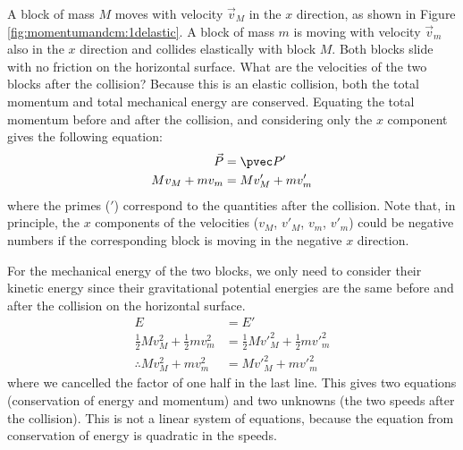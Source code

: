 \begin{example}{\label{ex:momentumandcm:1delastic}
A block of mass $M$ moves with velocity $\vec v_M$ in the $x$ direction, as shown in Figure \ref{fig:momentumandcm:1delastic}. A block of mass $m$ is moving with velocity $\vec v_m$ also in the $x$ direction and collides elastically with block $M$. Both blocks slide with no friction on the horizontal surface. What are the velocities of the two blocks after the collision?}
Because this is an elastic collision, both the total momentum and total mechanical energy are conserved. Equating the total momentum before and after the collision, and considering only the $x$ component gives the following equation:
\begin{align*}
\vec P &=\pvec P'\\
Mv_M+mv_m&=Mv'_M+mv'_m
\end{align*}
where the primes ($'$) correspond to the quantities after the collision. Note that, in principle, the $x$ components of the velocities ($v_M$, $v'_M$, $v_m$, $v'_m$) could be negative numbers if the corresponding block is moving in the negative $x$ direction.

For the mechanical energy of the two blocks, we only need to consider their kinetic energy since their gravitational potential energies are the same before and after the collision on the horizontal surface.
\begin{align*}
E &=E'\\
\frac{1}{2}Mv_M^2+\frac{1}{2}mv_m^2&=\frac{1}{2}Mv'^2_M+\frac{1}{2}mv'^2_m\\
\therefore Mv_M^2+mv_m^2&=Mv'^2_M+mv'^2_m
\end{align*}
where we cancelled the factor of one half in the last line. This gives two equations (conservation of energy and momentum) and two unknowns (the two speeds after the collision). This is not a linear system of equations, because the equation from conservation of energy is quadratic in the speeds.


\end{example}

